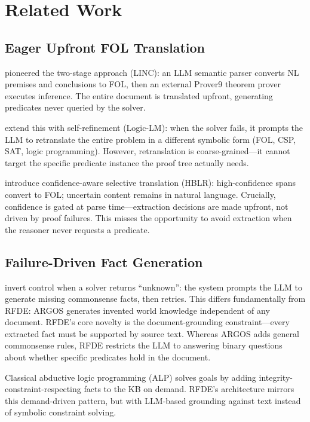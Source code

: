 \documentclass[11pt,letterpaper]{article}
\begin{document}
\section{Related Work}

\subsection{Eager Upfront FOL Translation}

\citet{Olausson2023} pioneered the two-stage approach (LINC): an LLM semantic parser converts
NL premises and conclusions to FOL, then an external Prover9 theorem prover executes
inference. The entire document is translated upfront, generating predicates never queried by
the solver.

\citet{Pan2023} extend this with self-refinement (Logic-LM): when the solver fails, it
prompts the LLM to retranslate the entire problem in a different symbolic form (FOL, CSP, SAT,
logic programming). However, retranslation is coarse-grained---it cannot target the specific
predicate instance the proof tree actually needs.

\citet{Li2025} introduce confidence-aware selective translation (HBLR): high-confidence spans
convert to FOL; uncertain content remains in natural language. Crucially, confidence is gated
at parse time---extraction decisions are made upfront, not driven by proof failures. This
misses the opportunity to avoid extraction when the reasoner never requests a predicate.

\subsection{Failure-Driven Fact Generation}

\citet{Zheng2024} invert control when a solver returns ``unknown'': the system prompts the LLM
to generate missing commonsense facts, then retries. This differs fundamentally from RFDE:
ARGOS generates invented world knowledge independent of any document. RFDE's core novelty is
the document-grounding constraint---every extracted fact must be supported by source text.
Whereas ARGOS adds general commonsense rules, RFDE restricts the LLM to answering binary
questions about whether specific predicates hold in the document.

Classical abductive logic programming (ALP) \citep{Kakas1992} solves goals by adding
integrity-constraint-respecting facts to the KB on demand. RFDE's architecture mirrors this
demand-driven pattern, but with LLM-based grounding against text instead of symbolic
constraint solving.
\end{document}

